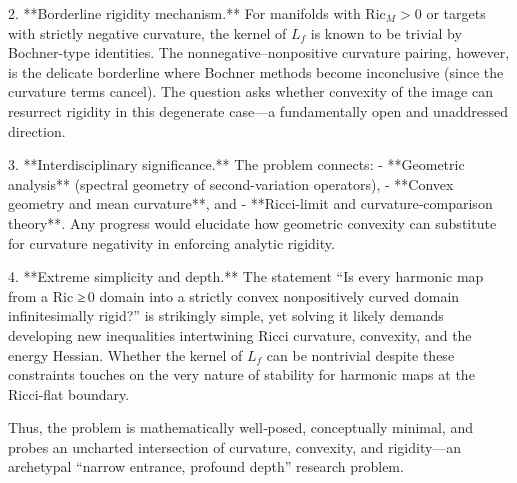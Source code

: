 2. **Borderline rigidity mechanism.**  
   For manifolds with \(\mathrm{Ric}_M > 0\) or targets with strictly negative curvature, the kernel of \(L_f\) is known to be trivial by Bochner-type identities.  The nonnegative–nonpositive curvature pairing, however, is the delicate borderline where Bochner methods become inconclusive (since the curvature terms cancel).  The question asks whether convexity of the image can resurrect rigidity in this degenerate case—a fundamentally open and unaddressed direction.

3. **Interdisciplinary significance.**  
   The problem connects:  
   - **Geometric analysis** (spectral geometry of second-variation operators),  
   - **Convex geometry and mean curvature**, and  
   - **Ricci-limit and curvature‑comparison theory**.  
   Any progress would elucidate how geometric convexity can substitute for curvature negativity in enforcing analytic rigidity.

4. **Extreme simplicity and depth.**  
   The statement “Is every harmonic map from a Ric ≥ 0 domain into a strictly convex nonpositively curved domain infinitesimally rigid?” is strikingly simple, yet solving it likely demands developing new inequalities intertwining Ricci curvature, convexity, and the energy Hessian. Whether the kernel of \(L_f\) can be nontrivial despite these constraints touches on the very nature of stability for harmonic maps at the Ricci‑flat boundary.  

Thus, the problem is mathematically well‑posed, conceptually minimal, and probes an uncharted intersection of curvature, convexity, and rigidity—an archetypal “narrow entrance, profound depth” research problem.